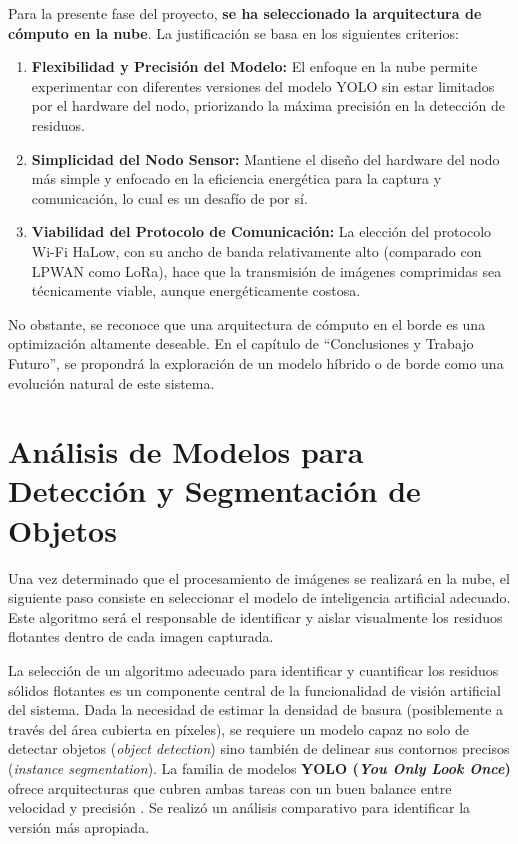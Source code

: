 Para la presente fase del proyecto, \textbf{se ha seleccionado la arquitectura de cómputo en la nube}. La justificación se basa en los siguientes criterios:

\begin{enumerate}
    \item \textbf{Flexibilidad y Precisión del Modelo:} El enfoque en la nube permite experimentar con diferentes versiones del modelo YOLO sin estar limitados por el hardware del nodo, priorizando la máxima precisión en la detección de residuos.
    \item \textbf{Simplicidad del Nodo Sensor:} Mantiene el diseño del hardware del nodo más simple y enfocado en la eficiencia energética para la captura y comunicación, lo cual es un desafío de por sí.
    \item \textbf{Viabilidad del Protocolo de Comunicación:} La elección del protocolo Wi-Fi HaLow, con su ancho de banda relativamente alto (comparado con LPWAN como LoRa), hace que la transmisión de imágenes comprimidas sea técnicamente viable, aunque energéticamente costosa.
\end{enumerate}

No obstante, se reconoce que una arquitectura de cómputo en el borde es una optimización altamente deseable. En el capítulo de ``Conclusiones y Trabajo Futuro'', se propondrá la exploración de un modelo híbrido o de borde como una evolución natural de este sistema.

\section{Análisis de Modelos para Detección y Segmentación de Objetos}
\label{sec:analisis_vision}
Una vez determinado que el procesamiento de imágenes se realizará en la nube, el siguiente paso consiste en seleccionar el modelo de inteligencia artificial adecuado. Este algoritmo será el responsable de identificar y aislar visualmente los residuos flotantes dentro de cada imagen capturada.



La selección de un algoritmo adecuado para identificar y cuantificar los residuos sólidos flotantes es un componente central de la funcionalidad de visión artificial del sistema. Dada la necesidad de estimar la densidad de basura (posiblemente a través del área cubierta en píxeles), se requiere un modelo capaz no solo de detectar objetos (\textit{object detection}) sino también de delinear sus contornos precisos (\textit{instance segmentation}). La familia de modelos \textbf{YOLO (\textit{You Only Look Once})} ofrece arquitecturas que cubren ambas tareas con un buen balance entre velocidad y precisión \cite{sapkota2025yolo}. Se realizó un análisis comparativo para identificar la versión más apropiada.

